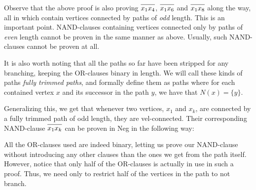 Observe that the above proof is also proving $\ol{x_1x_4}$, $\ol{x_1x_6}$ and $\ol{x_1x_8}$ along the way, all in which contain vertices connected by paths of \textit{odd} length.
This is an important point.
NAND-clauses containing vertices connected only by paths of \textit{even} length cannot be proven in the same manner as above.
Usually, such NAND-clauses cannot be proven at all.

It is also worth noting that all the paths so far have been stripped for any branching, keeping the OR-clauses binary in length.
We will call these kinds of paths \textit{fully trimmed paths}, and formally define them as paths where for each contained vertex $x$ and its successor in the path $y$, we have that $N(x) = \{y\}$.

Generalizing this, we get that whenever two vertices, $x_1$ and $x_k$, are connected by a fully trimmed path of odd length, they are vel-connected.
Their corresponding NAND-clause $\ol{x_1x_k}$ can be proven in Neg in the following way:
\begin{prooftree*}
\end{prooftree*}

All the OR-clauses used are indeed binary, letting us prove our NAND-clause without introducing any other clauses than the ones we get from the path itself.
However, notice that only half of the OR-clauses is actually in use in such a proof.
Thus, we need only to restrict half of the vertices in the path to not branch.

